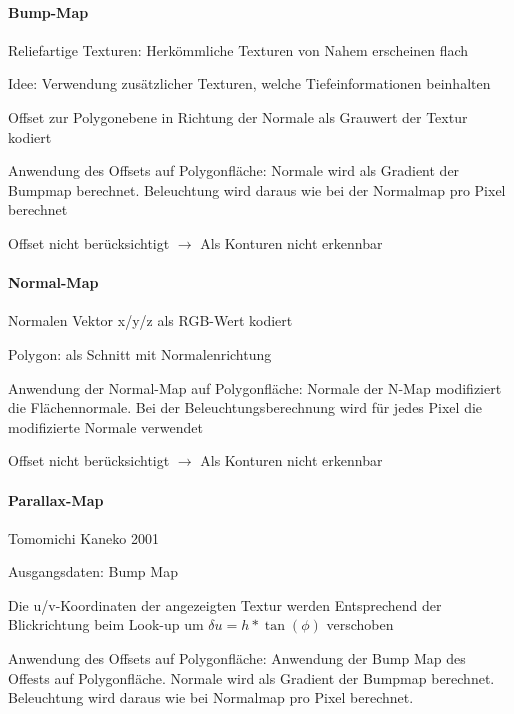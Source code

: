\documentclass[landscape]{article}
\begin{document}
\begin{multicols}{3}
  \paragraph{Bump-Map}
  \begin{itemize*}
    \item Reliefartige Texturen: Herkömmliche Texturen von Nahem erscheinen flach
    \item Idee: Verwendung zusätzlicher Texturen, welche Tiefeinformationen beinhalten
    \item Offset zur Polygonebene in Richtung der Normale als Grauwert der Textur kodiert
    \item Anwendung des Offsets auf Polygonfläche: Normale wird als Gradient der Bumpmap berechnet. Beleuchtung wird daraus wie bei der Normalmap pro Pixel berechnet
    \item Offset nicht berücksichtigt $\rightarrow$ Als Konturen nicht erkennbar
  \end{itemize*}
  
  \paragraph{Normal-Map}
  \begin{itemize*}
    \item Normalen Vektor x/y/z als RGB-Wert kodiert
    \item Polygon: als Schnitt mit Normalenrichtung
    \item Anwendung der Normal-Map auf Polygonfläche: Normale der N-Map modifiziert die Flächennormale. Bei der Beleuchtungsberechnung wird für jedes Pixel die modifizierte Normale verwendet
    \item Offset nicht berücksichtigt $\rightarrow$ Als Konturen nicht erkennbar
  \end{itemize*}
  
  \paragraph{Parallax-Map}
  Tomomichi Kaneko 2001
  \begin{itemize*}
    \item Ausgangsdaten: Bump Map
    \item Die u/v-Koordinaten der angezeigten Textur werden Entsprechend der Blickrichtung beim Look-up um $\delta u = h * \tan(\phi)$ verschoben
    \item Anwendung des Offsets auf Polygonfläche: Anwendung der Bump Map des Offests auf Polygonfläche. Normale wird als Gradient der Bumpmap berechnet. Beleuchtung wird daraus wie bei Normalmap pro Pixel berechnet.
  \end{itemize*}
  

\end{multicols}
\end{document}
